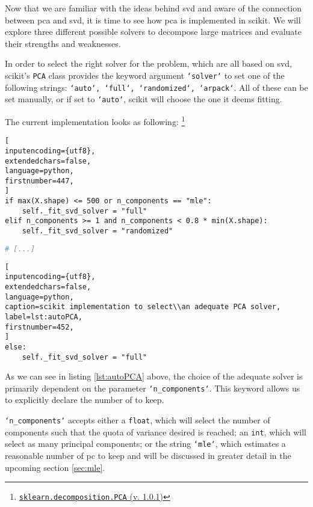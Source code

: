 Now that we are familiar with the ideas behind \gls{svd} and aware of the connection between \gls{pca} and \gls{svd}, it is time to see how \gls{pca} is implemented in \gls{scikit}.
We will explore three different possible solvers to decompose large matrices and evaluate their strengths and weaknesses.
\bigskip



In order to select the right solver for the problem, which are all based on \gls{svd}, \gls{scikit}'s \texttt{PCA} class provides the keyword argument \texttt{`solver`} to set one of the following strings: \texttt{`auto`, `full`, `randomized`, `arpack`}.
All of these can be set manually, or if set to \texttt{`auto`}, scikit will choose the one it deems fitting.
\bigskip

The current implementation looks as following:%
\footnote{\href{\scikitPCAvIxOxI{_pca}}{\texttt{sklearn.decomposition.PCA} (v. 1.0.1)}}






\begin{lstlisting}[
inputencoding={utf8}, 
extendedchars=false, 
language=python,
firstnumber=447,
]
if max(X.shape) <= 500 or n_components == "mle":
    self._fit_svd_solver = "full"
elif n_components >= 1 and n_components < 0.8 * min(X.shape):
    self._fit_svd_solver = "randomized"
\end{lstlisting}
%
%
%
\spacingConcatLists
\begin{lstlisting}[language=python, numbers=none]
# [...]
\end{lstlisting}
%
%
%
\spacingConcatLists
\begin{lstlisting}[
inputencoding={utf8}, 
extendedchars=false, 
language=python, 
caption=scikit implementation to select\\an adequate PCA solver, 
label=lst:autoPCA,
firstnumber=452,
]
else:
    self._fit_svd_solver = "full"
\end{lstlisting}


\medskip\noindent
As we can see in listing \ref{lst:autoPCA} above, the choice of the adequate solver is primarily dependent on the parameter \texttt{`n\_components`}.
This keyword allows us to explicitly declare the number of  to keep.

\texttt{`n\_components`} accepts either a \texttt{float}, which will select the number of components such that the quota of variance desired is reached; an \texttt{int}, which will select as many principal components; or the string \texttt{`mle`}, which estimates a reasonable number of \gls{pc} to keep and will be discussed in greater detail in the upcoming section \ref{sec:mle}.
\bigskip


